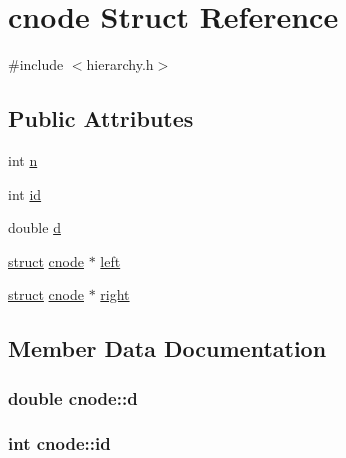 \hypertarget{structcnode}{}\section{cnode Struct Reference}
\label{structcnode}


{\ttfamily \#include $<$hierarchy.\+h$>$}

\subsection*{Public Attributes}
\begin{DoxyCompactItemize}
\item 
int \hyperlink{structcnode_a929f2cd1e7f84abb3deac2b9e0347969}{n}
\item 
int \hyperlink{structcnode_ac1c5e6b60375fa3d8343d2f1ac0be026}{id}
\item 
double \hyperlink{structcnode_a3fee5ca6280d1bbd1563b3af9bfe1f92}{d}
\item 
\hyperlink{gen__mat5files_8m_aa5a86657308844fba3fe81ef5286ca5f}{struct} \hyperlink{structcnode}{cnode} $\ast$ \hyperlink{structcnode_a45a49e46579552fb4928a4bd243d8def}{left}
\item 
\hyperlink{gen__mat5files_8m_aa5a86657308844fba3fe81ef5286ca5f}{struct} \hyperlink{structcnode}{cnode} $\ast$ \hyperlink{structcnode_a6e452d0478955a6a86f148901394cb05}{right}
\end{DoxyCompactItemize}


\subsection{Member Data Documentation}
\hypertarget{structcnode_a3fee5ca6280d1bbd1563b3af9bfe1f92}{}
\subsubsection[{d}]{\setlength{\rightskip}{0pt plus 5cm}double cnode\+::d}\label{structcnode_a3fee5ca6280d1bbd1563b3af9bfe1f92}
\hypertarget{structcnode_ac1c5e6b60375fa3d8343d2f1ac0be026}{}
\subsubsection[{id}]{\setlength{\rightskip}{0pt plus 5cm}int cnode\+::id}\label{structcnode_ac1c5e6b60375fa3d8343d2f1ac0be026}
\hypertarget{structcnode_a45a49e46579552fb4928a4bd243d8def}{}
